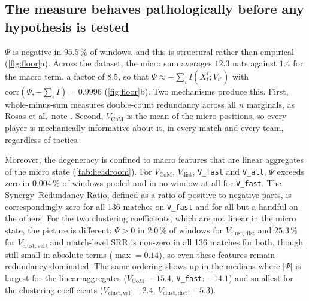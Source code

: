\documentclass[11pt,a4paper]{article}
\newcommand{\code}[1]{\texttt{\small #1}}
\newcommand{\Vcom}{V_{\mathrm{CoM}}}
\newcommand{\Vdist}{V_{\mathrm{dist}}}
\newcommand{\Vcd}{V_{\mathrm{clust,dist}}}
\newcommand{\Vcv}{V_{\mathrm{clust,vel}}}
\begin{document}
\subsection{The measure behaves pathologically before any hypothesis is tested}
\label{sec:res-measure}

$\Psi$ is negative in $95.5\,\%$ of windows, and this is structural rather than empirical
(\cref{fig:floor}a). Across the dataset, the micro sum averages $12.3$ nats against $1.4$
for the macro term, a factor of $8.5$, so that $\Psi\approx-\sum_i I(X^i_t;V_{t'})$
with $\mathrm{corr}(\Psi,-\sum_i I)=0.9996$ (\cref{fig:floor}b). Two mechanisms produce
this. First, whole-minus-sum measures double-count redundancy across all $n$ marginals, as
Rosas et al.\ note \cite{rosas2020}. Second, $\Vcom$ is the mean of the micro
positions, so every player is mechanically informative about it, in every match and
every team, regardless of tactics.

Moreover, the degeneracy is confined to macro features that are linear
aggregates of the micro state (\cref{tab:headroom}). For $\Vcom$, $\Vdist$,
\code{V\_fast} and \code{V\_all}, $\Psi$ exceeds zero in $0.004\,\%$ of windows pooled and
in no window at all for \code{V\_fast}. The Synergy--Redundancy Ratio, defined as a
ratio of positive to negative parts, is correspondingly zero for all 136 matches on
\code{V\_fast} and for all but a handful on the others. For the two clustering
coefficients, which are not linear in the micro state, the picture is different: $\Psi>0$
in $2.0\,\%$ of windows for $\Vcd$ and $25.3\,\%$ for $\Vcv$, and match-level SRR is
non-zero in all 136 matches for both, though still small in absolute terms
($\max=0.14$), so even these features remain redundancy-dominated. The same ordering shows
up in the medians where $|\Psi|$ is largest for the linear aggregates ($\Vcom$: $-15.4$,
\code{V\_fast}: $-14.1$) and smallest for the clustering coefficients ($\Vcv$: $-2.4$,
$\Vcd$: $-5.3$).
\end{document}
